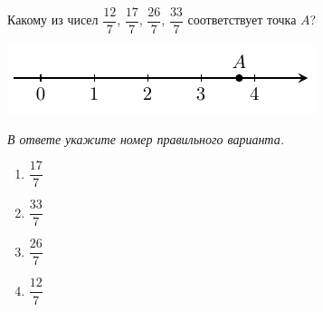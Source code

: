 Какому из чисел $\dfrac{12}{7}$, $\dfrac{17}{7}$, $\dfrac{26}{7}$, $\dfrac{33}{7}$ соответствует точка $A$?
\begin{center}
	\includegraphics{graphs/graph_2/graph_2}
\end{center}

\textit{В ответе укажите номер правильного варианта.}
\begin{multicols}{4}
	\begin{enumerate}[label=\arabic*)]
		\item $\dfrac{17}{7}$
		\item $\dfrac{33}{7}$
		\item $\dfrac{26}{7}$
		\item $\dfrac{12}{7}$
	\end{enumerate}
\end{multicols}